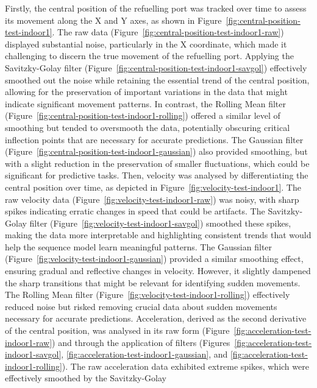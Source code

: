 \documentclass[12pt,oneside]{book} %
\begin{document}
Firstly, the central position of the refuelling port was tracked over time to
assess its movement along the X and Y axes, as shown in
Figure~\ref{fig:central-position-test-indoor1}. The raw data
(Figure~\ref{fig:central-position-test-indoor1-raw}) displayed substantial
noise, particularly in the X coordinate, which made it challenging to discern
the true movement of the refuelling port. Applying the Savitzky-Golay filter
(Figure~\ref{fig:central-position-test-indoor1-savgol}) effectively smoothed
out the noise while retaining the essential trend of the central position,
allowing for the preservation of important variations in the data that might
indicate significant movement patterns. In contrast, the Rolling Mean filter
(Figure~\ref{fig:central-position-test-indoor1-rolling}) offered a similar
level of smoothing but tended to oversmooth the data, potentially obscuring
critical inflection points that are necessary for accurate predictions. The
Gaussian filter (Figure~\ref{fig:central-position-test-indoor1-gaussian}) also
provided smoothing, but with a slight reduction in the preservation of smaller
fluctuations, which could be significant for predictive tasks. Then, velocity
was analysed by differentiating the central position over time, as depicted in
Figure~\ref{fig:velocity-test-indoor1}. The raw velocity data
(Figure~\ref{fig:velocity-test-indoor1-raw}) was noisy, with sharp spikes
indicating erratic changes in speed that could be artifacts. The Savitzky-Golay
filter (Figure~\ref{fig:velocity-test-indoor1-savgol}) smoothed these spikes,
making the data more interpretable and highlighting consistent trends that
would help the sequence model learn meaningful patterns. The Gaussian filter
(Figure~\ref{fig:velocity-test-indoor1-gaussian}) provided a similar smoothing
effect, ensuring gradual and reflective changes in velocity. However, it
slightly dampened the sharp transitions that might be relevant for identifying
sudden movements. The Rolling Mean filter
(Figure~\ref{fig:velocity-test-indoor1-rolling}) effectively reduced noise but
risked removing crucial data about sudden movements necessary for accurate
predictions. Acceleration, derived as the second derivative of the central
position, was analysed in its raw form
(Figure~\ref{fig:acceleration-test-indoor1-raw}) and through the application of
filters (Figures~\ref{fig:acceleration-test-indoor1-savgol},
\ref{fig:acceleration-test-indoor1-gaussian}, and
\ref{fig:acceleration-test-indoor1-rolling}). The raw acceleration data
exhibited extreme spikes, which were effectively smoothed by the Savitzky-Golay
\end{document}

